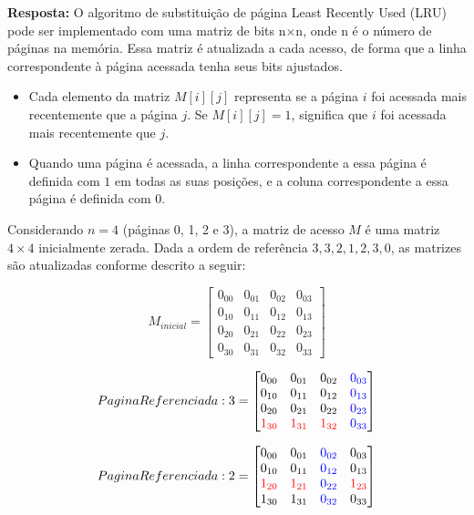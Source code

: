 \documentclass{article}
\begin{document}
\textbf{Resposta: }O algoritmo de substituição de página Least Recently Used (LRU) pode ser implementado com uma matriz de bits n×n, onde n é o número de páginas na memória. Essa matriz é atualizada a cada acesso, de forma que a linha correspondente à página acessada tenha seus bits ajustados.

\begin{itemize}
    \item Cada elemento da matriz $M[i][j]$ representa se a página $i$ foi acessada mais recentemente que a página $j$. Se $M[i][j]=1$, significa que $i$ foi acessada mais recentemente que $j$.
    \item Quando uma página é acessada, a linha correspondente a essa página é definida com $1$ em todas as suas posições, e a coluna correspondente a essa página é definida com $0$.
\end{itemize}

Considerando $n=4$ (páginas 0, 1, 2 e 3), a matriz de acesso $M$ é uma matriz $4×4$ inicialmente zerada. Dada a ordem de referência $3, 3, 2, 1, 2, 3, 0$, as matrizes são atualizadas conforme descrito a seguir:


\[M_{inicial} =
\begin{bmatrix}
  0_{00} & 0_{01} & 0_{02} & 0_{03}\\
  0_{10} & 0_{11} & 0_{12}    & 0_{13}\\
  0_{20} & 0_{21} & 0_{22}    & 0_{23}\\
  0_{30} & 0_{31} & 0_{32}    & 0_{33}
\end{bmatrix}
\]

\[PaginaReferenciada: 3 =
\begin{bmatrix}
  0_{00} & 0_{01} & 0_{02} & \textcolor{blue}{0_{03}}\\
  0_{10} & 0_{11} & 0_{12}    & \textcolor{blue}{0_{13}}\\
  0_{20} & 0_{21} & 0_{22}    & \textcolor{blue}{0_{23}}\\
  \textcolor{red}{1_{30}} & \textcolor{red}{1_{31}} & \textcolor{red}{1_{32}}    & \textcolor{blue}{0_{33}}
\end{bmatrix}
\]

\[
PaginaReferenciada: 2 =
\begin{bmatrix}
  0_{00} & 0_{01} & \textcolor{blue}{0_{02}} & 0_{03} \\
  0_{10} & 0_{11} & \textcolor{blue}{0_{12}} & 0_{13} \\
  \textcolor{red}{1_{20}} & \textcolor{red}{1_{21}} & \textcolor{blue}{0_{22}} & \textcolor{red}{1_{23}} \\
  1_{30} & 1_{31} & \textcolor{blue}{0_{32}} & 0_{33}
\end{bmatrix}
\]
\end{document}
